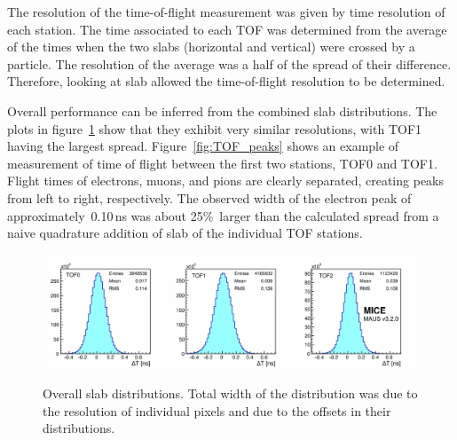 The resolution of the time-of-flight measurement was given by time resolution
of each station.
The time associated to each TOF was determined from the average of the times when the two slabs (horizontal and vertical) were crossed by a particle.
The resolution of the average was a half of the spread of their difference. Therefore, looking at slab \DT{} allowed the time-of-flight
resolution to be determined.


Overall performance can be inferred from the combined slab \DT{}
distributions. The plots in figure~\ref{fig:SlabDtAll} show that
they
exhibit very similar resolutions, with TOF1 having the largest spread.
Figure~\ref{fig:TOF_peaks} shows an example of measurement of time of
flight between the first two stations, TOF0 and TOF1. Flight times of electrons,
muons, and pions are clearly separated, creating peaks from left to
right, respectively. The observed width of the electron peak of
approximately~0.10\,ns was about 25\%~larger than the calculated spread from a
naive quadrature addition of slab \DT{} of the individual TOF stations.

\begin{figure}[htb!]
  \begin{center}
  \includegraphics[width=0.9\columnwidth]{07_overall_slab_dt_edited} \\
  \caption{Overall slab \DT{} distributions. Total width of the
    distribution was due to the resolution of individual pixels and due to
    the offsets in their \DT{} distributions.}
  \label{fig:SlabDtAll}
  \end{center}
\end{figure}

